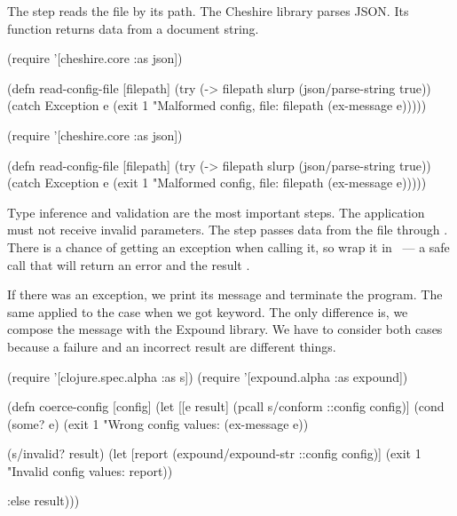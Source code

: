 \fi

The  step reads the file by its path. The Cheshire library parses JSON. Its  function returns data from a document string.


\ifnarrow

\begin{clojure}
(require '[cheshire.core :as json])

(defn read-config-file
  [filepath]
  (try
    (-> filepath
        slurp
        (json/parse-string true))
    (catch Exception e
      (exit 1
        "Malformed config,
                   file: %
            filepath (ex-message e)))))
\end{clojure}

\else

\begin{clojure}
(require '[cheshire.core :as json])

(defn read-config-file
  [filepath]
  (try
    (-> filepath slurp (json/parse-string true))
    (catch Exception e
      (exit 1 "Malformed config, file: %
            filepath (ex-message e)))))
\end{clojure}

\fi


Type inference and validation are the most important steps. The application must not receive invalid parameters. The  step passes data from the file through . There is a chance of getting an exception when calling it, so wrap it in ~--- a safe call that will return an error and the result .

If there was an exception, we print its message and terminate the program. The same applied to the case when we got  keyword. The only difference is, we compose the message with the Expound library. We have to consider both cases because a failure and an incorrect result are different things.

\ifnarrow

\begin{clojure}
(require '[clojure.spec.alpha :as s])
(require '[expound.alpha :as expound])

(defn coerce-config [config]
  (let [[e result] (pcall s/conform
                     ::config config)]
    (cond
      (some? e)
      (exit 1 "Wrong config values: %
        (ex-message e))

      (s/invalid? result)
      (let [report (expound/expound-str
                     ::config config)]
        (exit 1
          "Invalid config values: %
          \newline report))

      :else result)))
\end{clojure}

